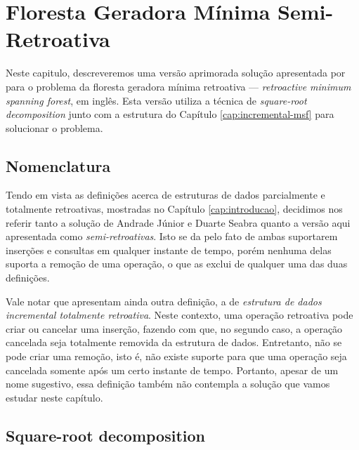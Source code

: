 
\chapter{Floresta Geradora Mínima Semi-Retroativa}
\label{cap:retroactive-msf}

Neste capitulo, descreveremos uma versão aprimorada solução apresentada por \citet{10.1093/comjnl/bxaa135} para o problema da floresta geradora mínima retroativa --- \emph{retroactive minimum spanning forest}, em inglês. Esta versão utiliza a técnica de \emph{square-root decomposition} junto com a estrutura do Capítulo \ref{cap:incremental-msf} para solucionar o problema.

\section{Nomenclatura}
\label{sec:nomeclatura}

Tendo em vista as definições acerca de estruturas de dados parcialmente e totalmente retroativas, mostradas no Capítulo \ref{cap:introducao}, decidimos nos referir tanto a solução de Andrade Júnior e Duarte Seabra quanto a versão aqui apresentada como \emph{semi-retroativas}. Isto se da pelo fato de ambas suportarem inserções e consultas em qualquer instante de tempo, porém nenhuma delas suporta a remoção de uma operação, o que as exclui de qualquer uma das duas definições.

Vale notar que \citet{DBLP:journals/corr/abs-1910-03332} apresentam ainda outra definição, a de \emph{estrutura de dados incremental totalmente retroativa}. Neste contexto, uma operação retroativa pode criar ou cancelar uma inserção, fazendo com que, no segundo caso, a operação cancelada seja totalmente removida da estrutura de dados. Entretanto, não se pode criar uma remoção, isto é, não existe suporte para que uma operação seja cancelada somente após um certo instante de tempo. Portanto, apesar de um nome sugestivo, essa definição também não contempla a solução que vamos estudar neste capítulo.

\section{Square-root decomposition}
\label{sec:sqrt-decomp}


